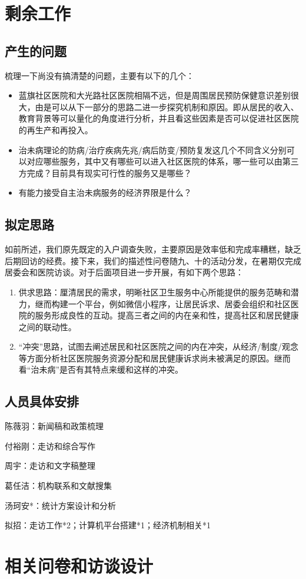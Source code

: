 \documentclass{article}
\begin{document}
    \section{剩余工作}
    \subsection{产生的问题}
    梳理一下尚没有搞清楚的问题，主要有以下的几个：
    \begin{itemize}
        \item 蓝旗社区医院和大光路社区医院相隔不远，但是周围居民预防保健意识差别很大，由是可以从下一部分的思路二进一步探究机制和原因。即从居民的收入、教育背景等可以量化的角度进行分析，并且看这些因素是否可以促进社区医院的再生产和再投入。
        \item 治未病理论的防病/治疗疾病先兆/病后防变/预防复发这几个不同含义分别可以对应哪些服务，其中又有哪些可以进入社区医院的体系，哪一些可以由第三方完成？目前具有现实可行性的服务又是哪些？
        \item 有能力接受自主治未病服务的经济界限是什么？
   \end{itemize}
    \subsection{拟定思路}
    如前所述，我们原先既定的入户调查失败，主要原因是效率低和完成率糟糕，缺乏后期回访的经费。接下来，我们的描述性问卷随九、十的活动分发，在暑期仅完成居委会和医院访谈。对于后面项目进一步开展，有如下两个思路：
    
    \begin{enumerate}
    \item 供求思路：厘清居民的需求，明晰社区卫生服务中心所能提供的服务范畴和潜力，继而构建一个平台，例如微信小程序，让居民诉求、居委会组织和社区医院的服务形成良性的互动。提高三者之间的内在亲和性，提高社区和居民健康之间的联动性。
    
    \item “冲突”思路，试图去阐述居民和社区医院之间的内在冲突，从经济/制度/观念等方面分析社区医院服务资源分配和居民健康诉求尚未被满足的原因。继而看“治未病”是否有其特点来缓和这样的冲突。
\end{enumerate}

\subsection{人员具体安排}
陈薇羽：新闻稿和政策梳理

付裕刚：走访和综合写作

周宇：走访和文字稿整理

葛任洁：机构联系和文献搜集

汤珂安*：统计方案设计和分析

拟招：走访工作*2；计算机平台搭建*1；经济机制相关*1

    \section{相关问卷和访谈设计}

    
    
    \begin{spacing}{0.9}
            
        
\end{spacing}
\end{document}
